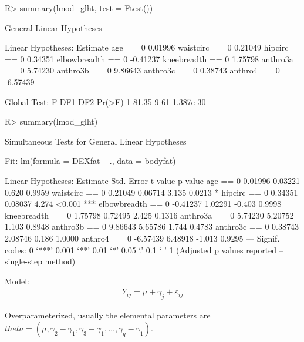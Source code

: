 \documentclass[landscape]{slides}
\begin{document}
\begin{Schunk}
\begin{Sinput}
R> summary(lmod_glht, test = Ftest())
\end{Sinput}
\begin{Soutput}
	 General Linear Hypotheses

Linear Hypotheses:
                  Estimate
age == 0           0.01996
waistcirc == 0     0.21049
hipcirc == 0       0.34351
elbowbreadth == 0 -0.41237
kneebreadth == 0   1.75798
anthro3a == 0      5.74230
anthro3b == 0      9.86643
anthro3c == 0      0.38743
anthro4 == 0      -6.57439

Global Test:
      F DF1 DF2    Pr(>F)
1 81.35   9  61 1.387e-30
\end{Soutput}
\end{Schunk}

\begin{Schunk}
\begin{Sinput}
R> summary(lmod_glht)
\end{Sinput}
\begin{Soutput}
	 Simultaneous Tests for General Linear Hypotheses

Fit: lm(formula = DEXfat ~ ., data = bodyfat)

Linear Hypotheses:
                  Estimate Std. Error t value p value    
age == 0           0.01996    0.03221   0.620  0.9959    
waistcirc == 0     0.21049    0.06714   3.135  0.0213 *  
hipcirc == 0       0.34351    0.08037   4.274  <0.001 ***
elbowbreadth == 0 -0.41237    1.02291  -0.403  0.9998    
kneebreadth == 0   1.75798    0.72495   2.425  0.1316    
anthro3a == 0      5.74230    5.20752   1.103  0.8948    
anthro3b == 0      9.86643    5.65786   1.744  0.4783    
anthro3c == 0      0.38743    2.08746   0.186  1.0000    
anthro4 == 0      -6.57439    6.48918  -1.013  0.9295    
---
Signif. codes:  0 ‘***’ 0.001 ‘**’ 0.01 ‘*’ 0.05 ‘.’ 0.1 ‘ ’ 1 
(Adjusted p values reported -- single-step method)
\end{Soutput}
\end{Schunk}


Model:
\begin{eqnarray*}
Y_{ij} = \mu + \gamma_{j} + \varepsilon_{ij}
\end{eqnarray*}

Overparameterized, usually the elemental parameters are
$theta = (\mu, \gamma_2 - \gamma_1, \gamma_3 - \gamma_1, \dots, \gamma_q - \gamma_1)$.
\end{document}
